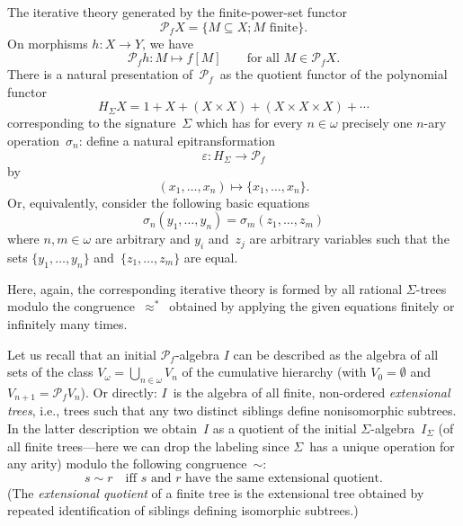 \documentclass{entcs}
\newcommand{\aps}{\ensuremath{\mathrel{\approx^*}}}
\newcommand{\Pf}{\ensuremath{\mathscr{P}_{\!\!f}}}
\newenvironment{pv}[1]{\begin{trivlist}
\item[\hspace{\labelsep}\normalfont\bfseries#1]}%
{\end{trivlist}}
\begin{document}
\begin{pv}{1.2 Example}
The iterative theory generated by the finite-power-set functor
\[\Pf X=\{M\subseteq X; M\text{ finite}\}.\]
On morphisms $h\colon X\to Y$, we have
\[\Pf h\colon M\mapsto f[M]\qquad\text{for all $M\in\Pf X$.}\]
There is a natural presentation of~\Pf\ as the quotient functor of
the polynomial functor
\[H_\Sigma X=1+X+(X\times X)+(X\times X\times X)+\dotsb\]
corresponding to the signature~$\Sigma$ which has for every
$n\in\omega$ precisely one $n$-ary operation~$\sigma_n$: define a
natural epitransformation
\[\varepsilon\colon H_\Sigma\to\Pf\]
by
\[(x_1,\dots,x_n)\mapsto\{x_1,\dots,x_n\}.\]
Or, equivalently, consider the following basic equations
\[\sigma_n(y_1,\dots,y_n)=\sigma_m(z_1,\dots,z_m)\]
where $n,m\in\omega$ are arbitrary and $y_i$ and~$z_j$ are arbitrary
variables such that the sets $\{y_1,\dots,y_n\}$
and~$\{z_1,\dots,z_m\}$ are equal.

Here, again, the corresponding iterative theory is formed by all
rational $\Sigma$-trees modulo the congruence~\aps\ obtained by
applying the given equations finitely or infinitely many times.

Let us recall that an initial \Pf-algebra $I$ can be described as
the algebra of all sets of
the class $V_\omega=\bigcup_{n\in\omega}V_n$ of
the cumulative hierarchy (with $V_0=\emptyset$ and $V_{n+1}=\Pf
V_n$). Or directly: $I$~is the algebra of all finite, non-ordered
\textit{extensional trees}, i.e., trees such that any two
distinct siblings
define nonisomorphic subtrees.
In the latter description we obtain~$I$ as a quotient of the initial
$\Sigma$-algebra~$I_\Sigma$ (of all finite trees---here we can drop
the labeling since $\Sigma$~has a unique operation for any arity)
modulo the following congruence~$\sim$:
\[s\sim r\quad\text{iff $s$ and $r$ have the same extensional
quotient.}\]
(The \textit{extensional quotient} of a finite tree is the extensional tree
obtained by repeated identification of siblings defining isomorphic
subtrees.)
\end{pv}
\end{document}

